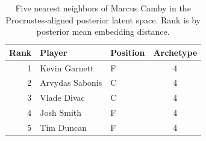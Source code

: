 \begin{table}[htbp]
  \centering\small
  \begin{tabular}{rllc}
    \toprule
    Rank & Player & Position & Archetype \\
    \midrule
    1 & Kevin Garnett & F & 4 \\
    2 & Arvydas Sabonis & C & 4 \\
    3 & Vlade Divac & C & 4 \\
    4 & Josh Smith & F & 4 \\
    5 & Tim Duncan & F & 4 \\
    \bottomrule
  \end{tabular}
  \caption{Five nearest neighbors of Marcus Camby in the Procrustes-aligned posterior latent space. Rank is by posterior mean embedding distance.}
  \label{tab:Marcus_Camby_neighbors}
\end{table}


